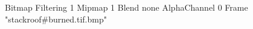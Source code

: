 {Bitmap
	{Filtering 1}
	{Mipmap 1}
	{Blend none}
	{AlphaChannel 0}
	{Frame "stackroof#burned.tif.bmp"}
}
